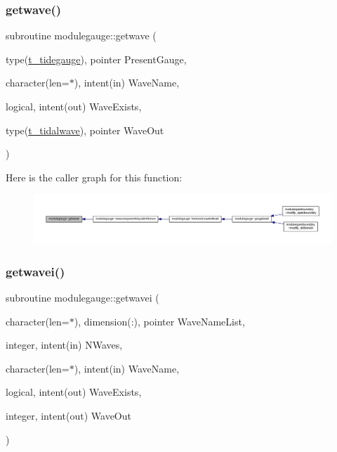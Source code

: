 \subsubsection{\texorpdfstring{getwave()}{getwave()}}
{\footnotesize\ttfamily subroutine modulegauge\+::getwave (\begin{DoxyParamCaption}\item[{type(\mbox{\hyperlink{structmodulegauge_1_1t__tidegauge}{t\+\_\+tidegauge}}), pointer}]{Present\+Gauge,  }\item[{character(len=$\ast$), intent(in)}]{Wave\+Name,  }\item[{logical, intent(out)}]{Wave\+Exists,  }\item[{type(\mbox{\hyperlink{structmodulegauge_1_1t__tidalwave}{t\+\_\+tidalwave}}), pointer}]{Wave\+Out }\end{DoxyParamCaption})\hspace{0.3cm}{\ttfamily [private]}}

Here is the caller graph for this function\+:\nopagebreak
\begin{figure}[H]
\begin{center}
\leavevmode
\includegraphics[width=350pt]{namespacemodulegauge_a0e2dffbc5ada081dc537e80f461ae0eb_icgraph}
\end{center}
\end{figure}
\mbox{\label{namespacemodulegauge_af6c96743755f8c096eb5335e0993e175}} 
\subsubsection{\texorpdfstring{getwavei()}{getwavei()}}
{\footnotesize\ttfamily subroutine modulegauge\+::getwavei (\begin{DoxyParamCaption}\item[{character(len=$\ast$), dimension(\+:), pointer}]{Wave\+Name\+List,  }\item[{integer, intent(in)}]{N\+Waves,  }\item[{character(len=$\ast$), intent(in)}]{Wave\+Name,  }\item[{logical, intent(out)}]{Wave\+Exists,  }\item[{integer, intent(out)}]{Wave\+Out }\end{DoxyParamCaption})\hspace{0.3cm}{\ttfamily [private]}}

